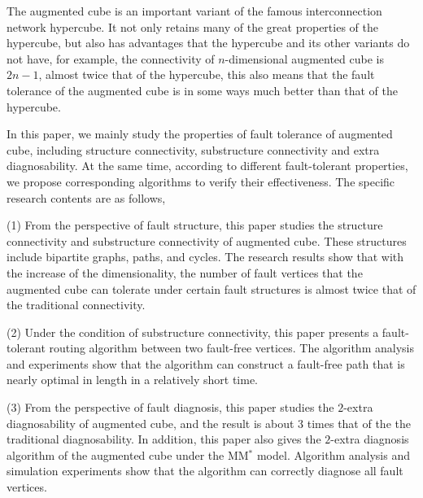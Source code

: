 \begin{englishabstract}
The augmented cube is an important variant of the famous interconnection network hypercube. It not only retains many of the great properties of the hypercube, but also has advantages that the hypercube and its other variants do not have, for example, the connectivity of $n$-dimensional augmented cube is $2n-1$, almost twice that of the hypercube, this also means that the fault tolerance of the augmented cube is in some ways much better than that of the hypercube.

In this paper, we mainly study the properties of fault tolerance of augmented cube, including structure connectivity, substructure connectivity and extra diagnosability. At the same time, according to different fault-tolerant properties, we propose corresponding algorithms to verify their effectiveness. The specific research contents are as follows,

(1) From the perspective of fault structure, this paper studies the structure connectivity and substructure connectivity of augmented cube. These structures include bipartite graphs, paths, and cycles. The research results show that with the increase of the dimensionality, the number of fault vertices that the augmented cube can tolerate under certain fault structures is almost twice that of the traditional connectivity.

(2) Under the condition of substructure connectivity, this paper presents a fault-tolerant routing algorithm between two fault-free vertices. The algorithm analysis and experiments show that the algorithm can construct a fault-free path that is nearly optimal in length in a relatively short time.

(3) From the perspective of fault diagnosis, this paper studies the $2$-extra diagnosability of augmented cube, and the result is about 3 times that of the the traditional diagnosability. In addition, this paper also gives the $2$-extra diagnosis algorithm of the augmented cube under the MM$^*$ model. Algorithm analysis and simulation experiments show that the algorithm can correctly diagnose all fault vertices.



\end{englishabstract}

